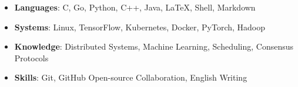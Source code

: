 
  \begin{itemize}[leftmargin=*]
    \item \textbf{Languages}: C, Go, Python, C++, Java, \LaTeX, Shell, Markdown \vspace{-2pt}
    \item \textbf{Systems}: Linux, TensorFlow, Kubernetes, Docker, PyTorch, Hadoop \vspace{-2pt}
    \item \textbf{Knowledge}: Distributed Systems, Machine Learning, Scheduling, Consensus Protocols \vspace{-2pt}
    \item \textbf{Skills}: Git, GitHub Open-source Collaboration, English Writing
  \end{itemize}